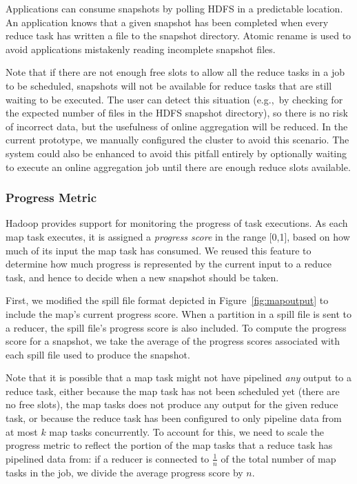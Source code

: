 Applications can consume snapshots by polling HDFS in a predictable
location. An application knows that a given snapshot has been
completed when every reduce task has written a file to the snapshot
directory.  Atomic rename is used to avoid applications mistakenly
reading incomplete snapshot files.

Note that if there are not enough free slots to allow all the reduce tasks in a
job to be scheduled, snapshots will not be available for reduce tasks that are
still waiting to be executed. The user can detect this situation (e.g.,\ by
checking for the expected number of files in the HDFS snapshot directory), so
there is no risk of incorrect data, but the usefulness of online aggregation
will be reduced. In the current prototype, we manually configured the cluster to
avoid this scenario. The system could also be enhanced to avoid this pitfall
entirely by optionally waiting to execute an online aggregation job until there
are enough reduce slots available.

\subsubsection{Progress Metric}
\label{sec:online-metric}
Hadoop provides support for monitoring the progress of task
executions. As each map task executes, it is assigned a \emph{progress
  score} in the range [0,1], based on how much of its input the map
task has consumed. We reused this feature to determine how much
progress is represented by the current input to a reduce task, and
hence to decide when a new snapshot should be taken.

First, we modified the spill file format depicted in
Figure~\ref{fig:mapoutput} to include the map's current progress
score. When a partition in a spill file is sent to a reducer, the
spill file's progress score is also included. To compute the progress
score for a snapshot, we take the average of the progress scores
associated with each spill file used to produce the snapshot.

Note that it is possible that a map task might not have pipelined
\emph{any} output to a reduce task, either because the map task has
not been scheduled yet (there are no free {\TT} slots), the map tasks does 
not produce any output for the given reduce task, or because the reduce task has 
been configured to only pipeline data from at most $k$ map tasks concurrently. 
To account for this, we need to scale the progress metric to reflect the portion 
of the map tasks that a reduce task has pipelined data from: if a reducer is 
connected to $\frac{1}{n}$ of the total number of map tasks in the job, we divide
the average progress score by $n$.

